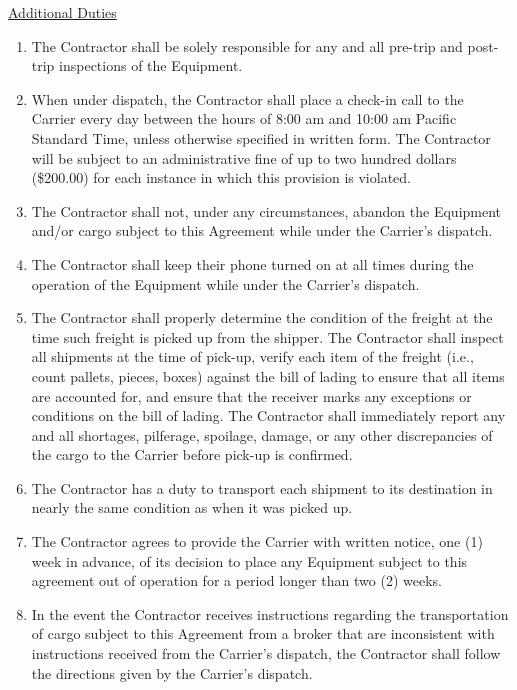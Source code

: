 \underline{Additional Duties}
\begin{enumerate}[ 
    ref = \SecondLevelEnumerator
]
    \item The Contractor shall be solely responsible for any and all
    pre-trip and post-trip inspections of the Equipment.

    \item When under dispatch, the Contractor shall place a check-in call
    to the Carrier every day between the hours of 8:00 am and 10:00 am
    Pacific Standard Time, unless otherwise specified in written form. The
    Contractor will be subject to an administrative fine of up to two
    hundred dollars (\$200.00) for each instance in which this provision is
    violated.
    
    \item The Contractor shall not, under any circumstances, abandon the
    Equipment and/or cargo subject to this Agreement while under the
    Carrier's dispatch.

    \item The Contractor shall keep their phone turned on at all times
    during the operation of the Equipment while under the Carrier's
    dispatch.

    \item The Contractor shall properly determine the condition of the
    freight at the time such freight is picked up from the shipper. The
    Contractor shall inspect all shipments at the time of pick-up, verify
    each item of the freight (i.e., count pallets, pieces, boxes) against
    the bill of lading to ensure that all items are accounted for, and
    ensure that the receiver marks any exceptions or conditions on the bill
    of lading. The Contractor shall immediately report any and all
    shortages, pilferage, spoilage, damage, or any other discrepancies of
    the cargo to the Carrier before pick-up is confirmed.

    \item The Contractor has a duty to transport each shipment to its
    destination in nearly the same condition as when it was picked up.

    \item The Contractor agrees to provide the Carrier with written notice,
    one (1) week in advance, of its decision to place any Equipment subject
    to this agreement out of operation for a period longer than two (2)
    weeks.
    
    \item In the event the Contractor receives instructions regarding the
    transportation of cargo subject to this Agreement from a broker that
    are inconsistent with instructions received from the Carrier's
    dispatch, the Contractor shall follow the directions given by the
    Carrier's dispatch.
\end{enumerate}